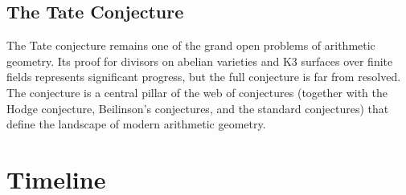 \subsection{The Tate Conjecture}

The Tate conjecture remains one of the grand open problems of arithmetic geometry. Its proof for divisors on abelian varieties and K3 surfaces over finite fields represents significant progress, but the full conjecture is far from resolved. The conjecture is a central pillar of the web of conjectures (together with the Hodge conjecture, Beilinson's conjectures, and the standard conjectures) that define the landscape of modern arithmetic geometry.

\section*{Timeline}
